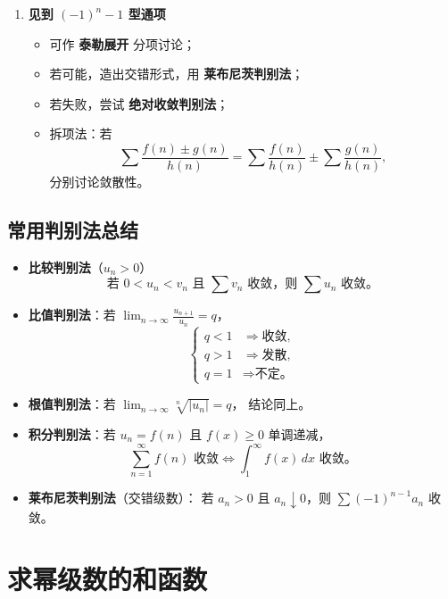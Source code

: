 \begin{enumerate}
    \item \textbf{见到 $(-1)^n - 1$ 型通项}
          \begin{itemize}
              \item 可作 \textbf{泰勒展开} 分项讨论；
              \item 若可能，造出交错形式，用 \textbf{莱布尼茨判别法}；
              \item 若失败，尝试 \textbf{绝对收敛判别法}；
              \item 拆项法：若
                    \[
                        \sum\frac{f(n)\pm g(n)}{h(n)} = \sum\frac{f(n)}{h(n)} \pm \sum\frac{g(n)}{h(n)},
                    \]
                    分别讨论敛散性。
          \end{itemize}
\end{enumerate}


\subsection{常用判别法总结}
\begin{itemize}
    \item \textbf{比较判别法}（$u_n>0$）
          \[
              \text{若 }0<u_n<v_n\text{ 且 }\sum v_n\text{ 收敛，则 }\sum u_n\text{ 收敛。}
          \]
    \item \textbf{比值判别法}：若 $\displaystyle \lim_{n\to\infty}\frac{u_{n+1}}{u_n}=q$，
          \[
              \begin{cases}
                  q<1 & \Rightarrow \text{收敛}, \\
                  q>1 & \Rightarrow \text{发散}, \\
                  q=1 & \Rightarrow \text{不定。}
              \end{cases}
          \]
    \item \textbf{根值判别法}：若 $\displaystyle \lim_{n\to\infty}\sqrt[n]{|u_n|}=q$，
          结论同上。
    \item \textbf{积分判别法}：若 $u_n=f(n)$ 且 $f(x)\ge 0$ 单调递减，
          \[
              \sum_{n=1}^{\infty} f(n)\text{ 收敛} \iff \int_1^{\infty} f(x)\,dx\text{ 收敛。}
          \]
    \item \textbf{莱布尼茨判别法}（交错级数）：
          若 $a_n>0$ 且 $a_n\downarrow 0$，则 $\sum (-1)^{n-1}a_n$ 收敛。
\end{itemize}

\section{求幂级数的和函数}

